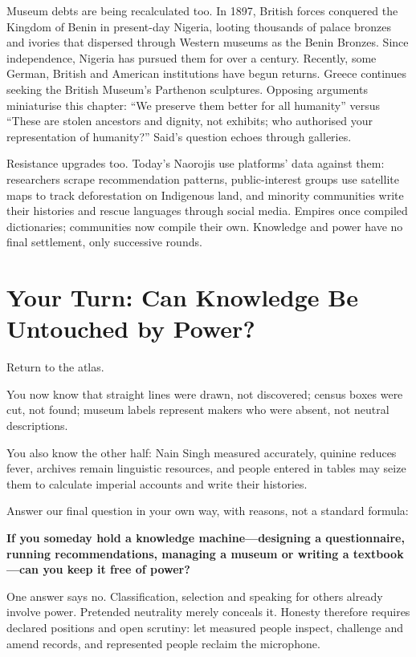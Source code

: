 Museum debts are being recalculated too. In 1897, British forces conquered the Kingdom of Benin in present-day Nigeria, looting thousands of palace bronzes and ivories that dispersed through Western museums as the Benin Bronzes. Since independence, Nigeria has pursued them for over a century. Recently, some German, British and American institutions have begun returns. Greece continues seeking the British Museum's Parthenon sculptures. Opposing arguments miniaturise this chapter: ``We preserve them better for all humanity'' versus ``These are stolen ancestors and dignity, not exhibits; who authorised your representation of humanity?'' Said's question echoes through galleries.

Resistance upgrades too. Today's Naorojis use platforms' data against them: researchers scrape recommendation patterns, public-interest groups use satellite maps to track deforestation on Indigenous land, and minority communities write their histories and rescue languages through social media. Empires once compiled dictionaries; communities now compile their own. Knowledge and power have no final settlement, only successive rounds.

\section[Your Turn: Knowledge without Power?]{Your Turn: Can Knowledge Be Untouched by Power?}
Return to the atlas.

You now know that straight lines were drawn, not discovered; census boxes were cut, not found; museum labels represent makers who were absent, not neutral descriptions.

You also know the other half: Nain Singh measured accurately, quinine reduces fever, archives remain linguistic resources, and people entered in tables may seize them to calculate imperial accounts and write their histories.

Answer our final question in your own way, with reasons, not a standard formula:

\textbf{If you someday hold a knowledge machine---designing a questionnaire, running recommendations, managing a museum or writing a textbook---can you keep it free of power?}

One answer says no. Classification, selection and speaking for others already involve power. Pretended neutrality merely conceals it. Honesty therefore requires declared positions and open scrutiny: let measured people inspect, challenge and amend records, and represented people reclaim the microphone.

